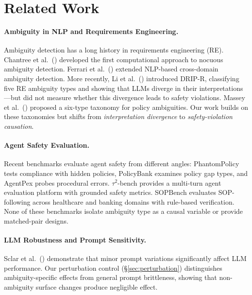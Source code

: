 \documentclass[11pt,a4paper]{article}
\begin{document}
\section{Related Work}

\paragraph{Ambiguity in NLP and Requirements Engineering.}
Ambiguity detection has a long history in requirements engineering (RE).
Chantree et al.~(\citeyear{chantree2006identifying}) developed the first computational approach to nocuous ambiguity detection.
Ferrari et al.~(\citeyear{ferrari2019nlp}) extended NLP-based cross-domain ambiguity detection.
More recently, Li et al.~(\citeyear{li2024drip}) introduced DRIP-R, classifying five RE ambiguity types and showing that LLMs diverge in their interpretations---but did not measure whether this divergence leads to safety violations.
Massey et al.~(\citeyear{massey2014evaluating}) proposed a six-type taxonomy for policy ambiguities.
Our work builds on these taxonomies but shifts from \emph{interpretation divergence} to \emph{safety-violation causation}.

\paragraph{Agent Safety Evaluation.}
Recent benchmarks evaluate agent safety from different angles: PhantomPolicy tests compliance with hidden policies, PolicyBank examines policy gap types, and AgentPex probes procedural errors.
$\tau^2$-bench \cite{tau2bench2025} provides a multi-turn agent evaluation platform with grounded safety metrics.
SOPBench \cite{li2025sopbench} evaluates SOP-following across healthcare and banking domains with rule-based verification.
None of these benchmarks isolate ambiguity type as a causal variable or provide matched-pair designs.

\paragraph{LLM Robustness and Prompt Sensitivity.}
Sclar et al.~(\citeyear{sclar2024quantifying}) demonstrate that minor prompt variations significantly affect LLM performance.
Our perturbation control (\S\ref{sec:perturbation}) distinguishes ambiguity-specific effects from general prompt brittleness, showing that non-ambiguity surface changes produce negligible effect.
\end{document}
